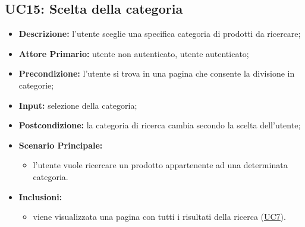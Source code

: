 \subsection{UC15: Scelta della categoria}
\label{sec:UC15}
\begin{itemize}
    \item \textbf{Descrizione:} l'utente sceglie una specifica categoria di prodotti da ricercare;
    \item \textbf{Attore Primario:} utente non autenticato, utente autenticato;
    \item \textbf{Precondizione:} l'utente si trova in una pagina che consente la divisione in categorie;
    \item \textbf{Input:} selezione della categoria;
    \item \textbf{Postcondizione:} la categoria di ricerca cambia secondo la scelta dell'utente;
    \item \textbf{Scenario Principale:}
          \begin{itemize}
              \item l'utente vuole ricercare un prodotto appartenente ad una determinata categoria.
          \end{itemize}
    \item \textbf{Inclusioni:}
          \begin{itemize}
              \item viene visualizzata una pagina con tutti i risultati della ricerca (\hyperref[sec:UC7]{\underline{UC7}}).
          \end{itemize}
\end{itemize}